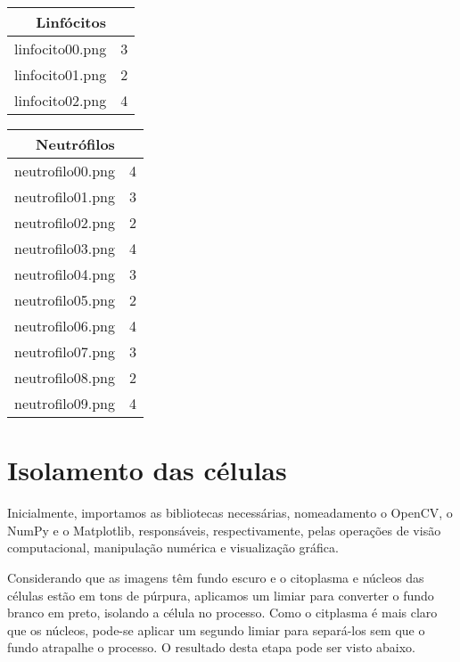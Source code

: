 \documentclass{article}
\begin{document}
\begin{table}[h]
\centering
\begin{minipage}{0.45\textwidth}
\centering
\begin{tabular}{|c|c|}
\hline
\multicolumn{2}{|c|}{Linfócitos} \\
\hline
linfocito00.png & 3 \\
linfocito01.png & 2 \\
linfocito02.png & 4 \\
\hline
\end{tabular}
\end{minipage}
\hfill
\begin{minipage}{0.45\textwidth}
\centering
\begin{tabular}{|c|c|}
\hline
\multicolumn{2}{|c|}{Neutrófilos} \\
\hline
neutrofilo00.png & 4 \\
neutrofilo01.png & 3 \\
neutrofilo02.png & 2 \\
neutrofilo03.png & 4 \\
neutrofilo04.png & 3 \\
neutrofilo05.png & 2 \\
neutrofilo06.png & 4 \\
neutrofilo07.png & 3 \\
neutrofilo08.png & 2 \\
neutrofilo09.png & 4 \\
\hline
\end{tabular}
\end{minipage}
\end{table}

\section{Isolamento das células}

Inicialmente, importamos as bibliotecas necessárias, nomeadamento o OpenCV, o NumPy e o Matplotlib, responsáveis, respectivamente, pelas operações de visão computacional, manipulação numérica e visualização gráfica.

Considerando que as imagens têm fundo escuro e o citoplasma e núcleos das células estão em tons de púrpura, aplicamos um limiar para converter o fundo branco em preto, isolando a célula no processo. Como o citplasma é mais claro que os núcleos, pode-se aplicar um segundo limiar para separá-los sem que o fundo atrapalhe o processo. O resultado desta etapa pode ser visto abaixo.
\end{document}
